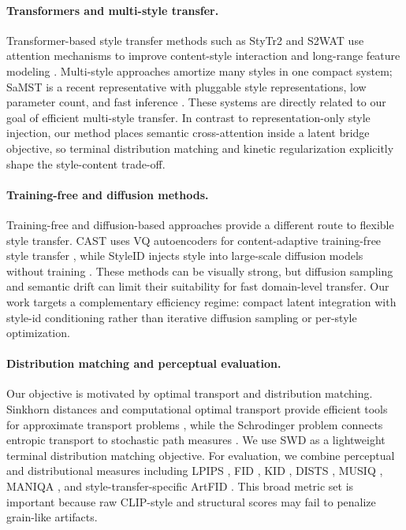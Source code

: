 ﻿\documentclass[letterpaper]{article}
\begin{document}
\paragraph{Transformers and multi-style transfer.}
Transformer-based style transfer methods such as StyTr2 and S2WAT use attention mechanisms to improve content-style interaction and long-range feature modeling \cite{deng2022stytr2,xia2024s2wat}. Multi-style approaches amortize many styles in one compact system; SaMST is a recent representative with pluggable style representations, low parameter count, and fast inference \cite{liu2024samst}. These systems are directly related to our goal of efficient multi-style transfer. In contrast to representation-only style injection, our method places semantic cross-attention inside a latent bridge objective, so terminal distribution matching and kinetic regularization explicitly shape the style-content trade-off.

\paragraph{Training-free and diffusion methods.}
Training-free and diffusion-based approaches provide a different route to flexible style transfer. CAST uses VQ autoencoders for content-adaptive training-free style transfer \cite{gim2024cast}, while StyleID injects style into large-scale diffusion models without training \cite{chung2024styleid}. These methods can be visually strong, but diffusion sampling and semantic drift can limit their suitability for fast domain-level transfer. Our work targets a complementary efficiency regime: compact latent integration with style-id conditioning rather than iterative diffusion sampling or per-style optimization.

\paragraph{Distribution matching and perceptual evaluation.}
Our objective is motivated by optimal transport and distribution matching. Sinkhorn distances and computational optimal transport provide efficient tools for approximate transport problems \cite{cuturi2013sinkhorn,peyre2019computational}, while the Schrodinger problem connects entropic transport to stochastic path measures \cite{leonard2014survey}. We use SWD as a lightweight terminal distribution matching objective. For evaluation, we combine perceptual and distributional measures including LPIPS \cite{zhang2018lpips}, FID \cite{heusel2017fid}, KID \cite{binkowski2018kid}, DISTS \cite{ding2020dists}, MUSIQ \cite{ke2021musiq}, MANIQA \cite{yang2022maniqa}, and style-transfer-specific ArtFID \cite{wright2022artfid}. This broad metric set is important because raw CLIP-style and structural scores may fail to penalize grain-like artifacts.
\end{document}
